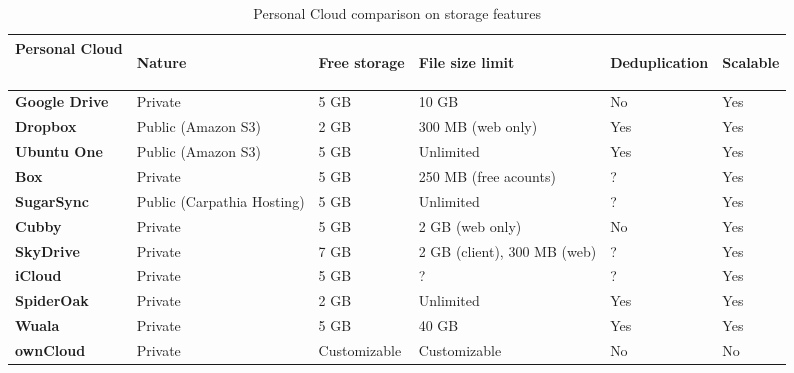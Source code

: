 \begin{table}
\begin{center}
    \begin{tabular}{ | p{3.4cm} | p{2.0cm} | p{2.6cm} | p{2.6cm} | p{1.0cm} | p{1.0cm} | }
    \hline
    \rowcolor[gray]{0.8}

	\textbf{Personal Cloud} &
	\begin{sideways}\textbf{Nature}\end{sideways} &
	\begin{sideways}\textbf{Free storage}\end{sideways} &
	\begin{sideways}\textbf{File size limit}\end{sideways} & 
	\begin{sideways}\textbf{Deduplication}\end{sideways} & 
	\begin{sideways}\textbf{Scalable}\end{sideways} \\ \hline

	\textbf{Google Drive} &
	Private &
	5 GB &
	10 GB &
	No &
	Yes \\ \hline

	\textbf{Dropbox} &
	Public (Amazon S3) &
	2 GB &
	300 MB (web only) &
	Yes &
	Yes \\ \hline
	
	\textbf{Ubuntu One} &
	Public (Amazon S3) &
	5 GB &
	Unlimited &
	Yes &
	Yes \\ \hline
	
	\textbf{Box} &
	Private &
	5 GB & 
	250 MB (free acounts) &
	? &
	Yes \\ \hline
	
	\textbf{SugarSync} & 
	Public (Carpathia Hosting) &
	5 GB &
	Unlimited &
	? &
	Yes \\ \hline
	
	\textbf{Cubby} &
	Private &
	5 GB &
	2 GB (web only) &
	No &
	Yes \\ \hline
	
	\textbf{SkyDrive} & 
	Private &
	7 GB &
	2 GB (client), 300 MB (web) &
	? &
	Yes \\ \hline

	\textbf{iCloud} &
	Private &
	5 GB &
	? &
	? &
	Yes \\ \hline
	
	\textbf{SpiderOak} & 
	Private &
	2 GB &
	Unlimited &
	Yes &
	Yes \\ \hline

	\textbf{Wuala} &
	Private &
	5 GB &
	40 GB &
	Yes &
	Yes \\ \hline
	
	\textbf{ownCloud} &
	Private &
	Customizable &
	Customizable &
	No &
	No \\ \hline

    \end{tabular}
    \\[10pt]
    \caption{Personal Cloud comparison on storage features}
    \label{tab:pc_storage}
\end{center}
\end{table}

